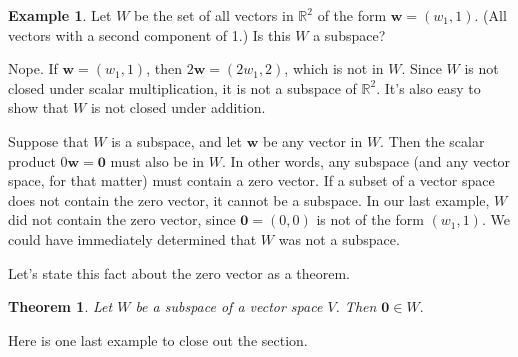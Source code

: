 \documentclass[
]{book}
\newtheorem{theorem}{Theorem}[chapter]
\theoremstyle{definition}
\theoremstyle{definition}
\newtheorem{example}{Example}[chapter]
\theoremstyle{definition}
\theoremstyle{definition}
\theoremstyle{remark}
\begin{document}
\begin{examplebox}

\begin{example}
Let \(W\) be the set of all vectors in \(\mathbb{R}^2\) of the form
\(\mathbf{w}=(w_1,1)\). (All vectors with a second component of 1.)
Is this \(W\) a subspace?

Nope. If \(\mathbf{w}=(w_1,1)\), then \(2\mathbf{w}=(2w_1,2)\), which is not in \(W\). Since \(W\) is not closed under scalar multiplication, it is not a subspace of \(\mathbb{R}^2\). It's also easy to show that \(W\) is not closed under addition.
\end{example}

\end{examplebox}

Suppose that \(W\) is a subspace, and let \(\mathbf{w}\) be any vector in \(W\). Then the scalar product \(0\mathbf{w}=\mathbf{0}\) must also be in \(W\). In other words, any subspace (and any vector space, for that matter) must contain a zero vector. If a subset of a vector space does not contain the zero vector, it cannot be a subspace.
In our last example, \(W\) did not contain the zero vector, since \(\mathbf{0}=(0,0)\) is not of the form \((w_1,1)\). We could have immediately determined that \(W\) was not a subspace.

Let's state this fact about the zero vector as a theorem.

\begin{theorembox}

\begin{theorem}
\protect\hypertarget{thm:zerovector}{}\label{thm:zerovector}Let \(W\) be a subspace of a vector space \(V\). Then \(\mathbf{0}\in W.\)
\end{theorem}

\end{theorembox}

Here is one last example to close out the section.
\end{document}
